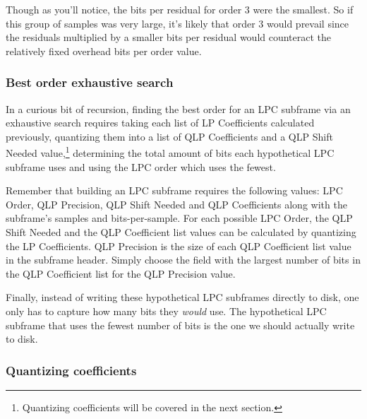 Though as you'll notice, the bits per residual for order 3 were the smallest.
So if this group of samples was very large, it's likely that order 3
would prevail since the residuals multiplied by a smaller bits per residual
would counteract the relatively fixed overhead bits per order value.

\subsubsection{Best order exhaustive search}

In a curious bit of recursion, finding the best order for an LPC subframe
via an exhaustive search requires taking each list of LP Coefficients
calculated previously, quantizing them into a list of QLP Coefficients
and a QLP Shift Needed value,\footnote{Quantizing coefficients will be covered in the next section.}
determining the total amount of bits each hypothetical LPC subframe
uses and using the LPC order which uses the fewest.

Remember that building an LPC subframe requires the following values:
LPC Order, QLP Precision, QLP Shift Needed and QLP Coefficients along
with the subframe's samples and bits-per-sample.
For each possible LPC Order, the QLP Shift Needed and the QLP Coefficient
list values can be calculated by quantizing the LP Coefficients.
QLP Precision is the size of each QLP Coefficient list value in the
subframe header.
Simply choose the field with the largest number of bits in the
QLP Coefficient list for the QLP Precision value.

Finally, instead of writing these hypothetical LPC subframes directly to disk,
one only has to capture how many bits they \textit{would} use.
The hypothetical LPC subframe that uses the fewest number of bits
is the one we should actually write to disk.

\pagebreak

\subsubsection{Quantizing coefficients}

